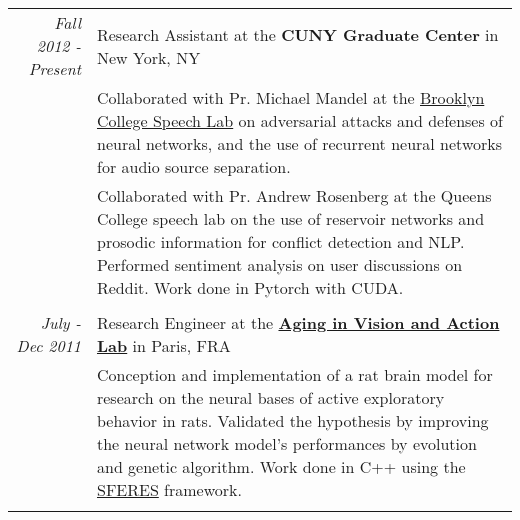 \documentclass[a4paper,10pt]{article}
\begin{document}
\begin{tabular}{r|p{14cm}}
        \emph{Fall 2012 - Present} & Research Assistant at the {\bfseries CUNY Graduate Center} in New York, NY \\
        & \small{Collaborated with Pr. Michael Mandel at the \href{https://www.gc.cuny.edu/CUNY_GC/media/Computer-Science/SpeechLab.pdf}{Brooklyn College Speech Lab} on adversarial attacks and defenses of neural networks, and the use of recurrent neural networks for audio source separation.}\\
        & \small{Collaborated with Pr. Andrew Rosenberg at the Queens College speech lab on the use of reservoir networks and prosodic information for conflict detection and NLP. Performed sentiment analysis on user discussions on Reddit. Work done in Pytorch with CUDA.}\\
        \multicolumn{2}{c}{} \\

        \emph{July - Dec 2011} & Research Engineer at the {\bfseries \href{http://www.aging-vision-action.fr/}{Aging in Vision and Action Lab} }in Paris, FRA\\
        & \small{Conception and implementation of a rat brain model for research on the neural bases of active exploratory behavior in rats. Validated the hypothesis by improving the neural network model's performances by evolution and genetic algorithm. Work done in C++ using the \href{https://github.com/sferes2/sferes2}{SFERES} framework.}\\
        \multicolumn{2}{c}{} \\


    \end{tabular}
\end{document}
